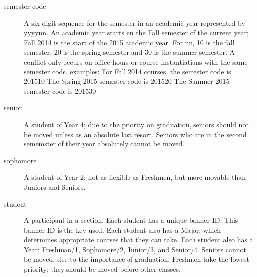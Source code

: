 \begin{description}
\item[semester code]A six-digit sequence for the semester in an academic year represented by yyyynn.   An academic year starts on the Fall semester of the current year; Fall 2014 is the start of the 2015 academic year.  For nn, 10 is the fall semester, 20 is the spring semester and 30 is the summer semester.
A conflict only occurs on office hours or course instantiations with the same semester code.
examples:
For Fall 2014 courses, the semester code is 201510
The Spring 2015 semester code is 201520
The Summer 2015 semester code is 201530

 \item[senior]A student of Year 4; due to the priority on graduation, seniors should not be moved unless as an absolute last resort.  Seniors who are in the second sememster of their year absolutely cannot be moved.
  \item[sophomore]A student of Year 2; not as flexible as Freshmen, but more movable than Juniors and Seniors.
  \item[student] A participant in a section.  Each student has a unique banner ID.  This banner ID is the key used.  Each student also has a Major, which determines appropriate courses that they can take.  Each student also has a Year: Freshman/1, Sophomore/2, Junior/3, and Senior/4.  Seniors cannot be moved, due to the importance of graduation.  Freshmen take the lowest priority; they should be moved before other classes.
\end{description}
